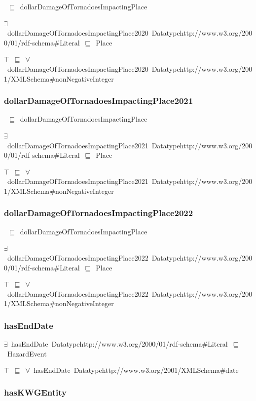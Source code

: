 \documentclass{article}
\begin{document}
~\ensuremath{\sqsubseteq}~dollarDamageOfTornadoesImpactingPlace

\ensuremath{\exists}~dollarDamageOfTornadoesImpactingPlace2020~Datatypehttp://www.w3.org/2000/01/rdf-schema#Literal~\ensuremath{\sqsubseteq}~Place

\ensuremath{\top}~\ensuremath{\sqsubseteq}~\ensuremath{\forall}~dollarDamageOfTornadoesImpactingPlace2020~Datatypehttp://www.w3.org/2001/XMLSchema#nonNegativeInteger

\subsubsection*{dollarDamageOfTornadoesImpactingPlace2021}

~\ensuremath{\sqsubseteq}~dollarDamageOfTornadoesImpactingPlace

\ensuremath{\exists}~dollarDamageOfTornadoesImpactingPlace2021~Datatypehttp://www.w3.org/2000/01/rdf-schema#Literal~\ensuremath{\sqsubseteq}~Place

\ensuremath{\top}~\ensuremath{\sqsubseteq}~\ensuremath{\forall}~dollarDamageOfTornadoesImpactingPlace2021~Datatypehttp://www.w3.org/2001/XMLSchema#nonNegativeInteger

\subsubsection*{dollarDamageOfTornadoesImpactingPlace2022}

~\ensuremath{\sqsubseteq}~dollarDamageOfTornadoesImpactingPlace

\ensuremath{\exists}~dollarDamageOfTornadoesImpactingPlace2022~Datatypehttp://www.w3.org/2000/01/rdf-schema#Literal~\ensuremath{\sqsubseteq}~Place

\ensuremath{\top}~\ensuremath{\sqsubseteq}~\ensuremath{\forall}~dollarDamageOfTornadoesImpactingPlace2022~Datatypehttp://www.w3.org/2001/XMLSchema#nonNegativeInteger

\subsubsection*{hasEndDate}

\ensuremath{\exists}~hasEndDate~Datatypehttp://www.w3.org/2000/01/rdf-schema#Literal~\ensuremath{\sqsubseteq}~HazardEvent

\ensuremath{\top}~\ensuremath{\sqsubseteq}~\ensuremath{\forall}~hasEndDate~Datatypehttp://www.w3.org/2001/XMLSchema#date

\subsubsection*{hasKWGEntity}
\end{document}
